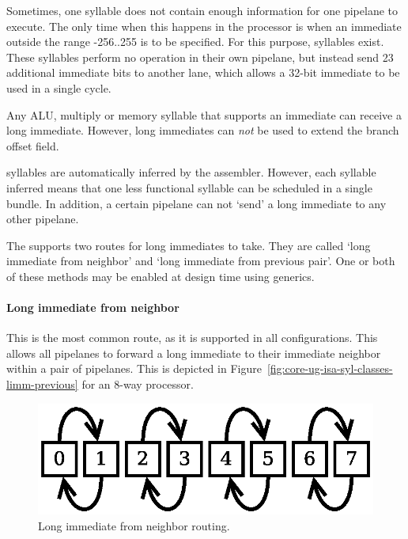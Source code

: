 Sometimes, one syllable does not contain enough information for one pipelane to 
execute. The only time when this happens in the \rvex{} processor is when an 
immediate outside the range -256..255 is to be specified. For this purpose, 
 syllables exist. These syllables perform no operation in their own 
pipelane, but instead send 23 additional immediate bits to another lane, which 
allows a 32-bit immediate to be used in a single cycle.

Any ALU, multiply or memory syllable that supports an immediate can receive a
long immediate. However, long immediates can \textit{not} be used to extend the
branch offset field.

 syllables are automatically inferred by the assembler. However,
each  syllable inferred means that one less functional syllable can
be scheduled in a single bundle. In addition, a certain pipelane can not `send'
a long immediate to any other pipelane.

The \rvex{} supports two routes for long immediates to take. They are called
`long immediate from neighbor' and `long immediate from previous pair'. One or
both of these methods may be enabled at design time using generics.

\paragraph*{Long immediate from neighbor}

This is the most common route, as it is supported in all \rvex{} configurations. 
This allows all pipelanes to forward a long immediate to their immediate 
neighbor within a pair of pipelanes. This is depicted in 
Figure~\ref{fig:core-ug-isa-syl-classes-limm-previous} for an 8-way \rvex{} 
processor.

\begin{figure}[h!]
  \centering
  \includegraphics[scale=0.6]{assets/long-immediate-fwding/neighbor}
  \caption{Long immediate from neighbor routing.}
  \label{fig:core-ug-isa-syl-classes-limm-neighbor}
\end{figure}

